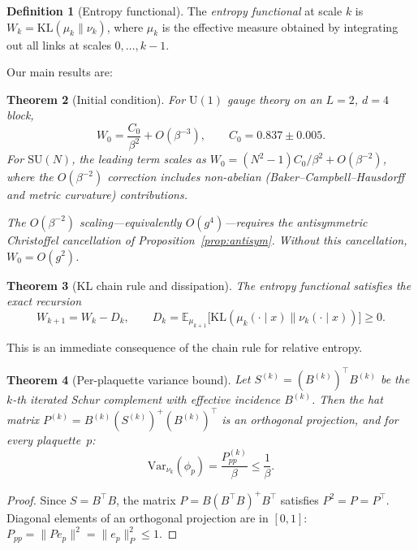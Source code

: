 \documentclass[11pt]{article}
\newtheorem{theorem}{Theorem}[section]
\theoremstyle{definition}
\newtheorem{definition}[theorem]{Definition}
\newcommand{\KL}{\mathrm{KL}}
\newcommand{\Var}{\mathrm{Var}}
\newcommand{\E}{\mathbb{E}}
\begin{document}
\begin{definition}[Entropy functional]
The \emph{entropy functional} at scale $k$ is 
$W_k = \KL(\mu_k \| \nu_k)$, where $\mu_k$ is the effective measure 
obtained by integrating out all links at scales $0, \ldots, k-1$.
\end{definition}

Our main results are:

\begin{theorem}[Initial condition]\label{thm:W0}
For $\mathrm{U}(1)$ gauge theory on an $L = 2$, $d = 4$ block,
\[
  W_0 = \frac{C_0}{\beta^2} + O(\beta^{-3}), \qquad 
  C_0 = 0.837 \pm 0.005.
\]
For $\mathrm{SU}(N)$, the leading term scales as 
$W_0 = (N^2 - 1) C_0/\beta^2 + O(\beta^{-2})$, where the $O(\beta^{-2})$ 
correction includes non-abelian (Baker--Campbell--Hausdorff and metric 
curvature) contributions.

The $O(\beta^{-2})$ scaling---equivalently $O(g^4)$---requires the 
antisymmetric Christoffel cancellation of Proposition~\ref{prop:antisym}.  
Without this cancellation, $W_0 = O(g^2)$.
\end{theorem}

\begin{theorem}[KL chain rule and dissipation]\label{thm:KL}
The entropy functional satisfies the exact recursion
\[
  W_{k+1} = W_k - D_k, \qquad 
  D_k = \E_{\mu_{k+1}}\bigl[\KL(\mu_k(\cdot \mid x) \| 
  \nu_k(\cdot \mid x))\bigr] \geq 0.
\]
\end{theorem}

This is an immediate consequence of the chain rule for relative entropy.

\begin{theorem}[Per-plaquette variance bound]\label{thm:plaq_bound}
Let $S^{(k)} = (B^{(k)})^\top B^{(k)}$ be the $k$-th iterated Schur 
complement with effective incidence $B^{(k)}$.  Then the hat matrix 
$P^{(k)} = B^{(k)} (S^{(k)})^+ (B^{(k)})^\top$ is an orthogonal 
projection, and for every plaquette~$p$:
\begin{equation}\label{eq:plaq_bound}
  \Var_{\nu_k}(\phi_p) = \frac{P_{pp}^{(k)}}{\beta} \leq \frac{1}{\beta}.
\end{equation}
\end{theorem}

\begin{proof}
Since $S = B^\top B$, the matrix $P = B(B^\top B)^+ B^\top$ satisfies 
$P^2 = P = P^\top$.  Diagonal elements of an orthogonal projection 
are in $[0,1]$: $P_{pp} = \|P e_p\|^2 = \|e_p\|^2_{P} \leq 1$.
\end{proof}
\end{document}

